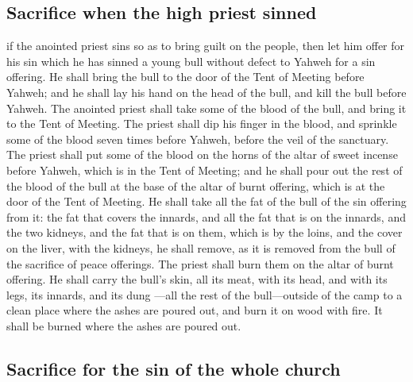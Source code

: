 \hypertarget{sacrifice-when-the-high-priest-sinned}{%
\subsection{Sacrifice when the high priest
sinned}\label{sacrifice-when-the-high-priest-sinned}}

 if the anointed priest sins so as to bring guilt on the
people, then let him offer for his sin which he has sinned a young bull
without defect to Yahweh for a sin offering.  He shall
bring the bull to the door of the Tent of Meeting before Yahweh; and he
shall lay his hand on the head of the bull, and kill the bull before
Yahweh.  The anointed priest shall take some of the blood
of the bull, and bring it to the Tent of Meeting.  The
priest shall dip his finger in the blood, and sprinkle some of the blood
seven times before Yahweh, before the veil of the sanctuary.
 The priest shall put some of the blood on the horns of
the altar of sweet incense before Yahweh, which is in the Tent of
Meeting; and he shall pour out the rest of the blood of the bull at the
base of the altar of burnt offering, which is at the door of the Tent of
Meeting.  He shall take all the fat of the bull of the sin
offering from it: the fat that covers the innards, and all the fat that
is on the innards,  and the two kidneys, and the fat that
is on them, which is by the loins, and the cover on the liver, with the
kidneys, he shall remove,  as it is removed from the bull
of the sacrifice of peace offerings. The priest shall burn them on the
altar of burnt offering.  He shall carry the bull's skin,
all its meat, with its head, and with its legs, its innards, and its
dung  ---all the rest of the bull---outside of the camp
to a clean place where the ashes are poured out, and burn it on wood
with fire. It shall be burned where the ashes are poured out.

\hypertarget{sacrifice-for-the-sin-of-the-whole-church}{%
\subsection{Sacrifice for the sin of the whole
church}\label{sacrifice-for-the-sin-of-the-whole-church}}

